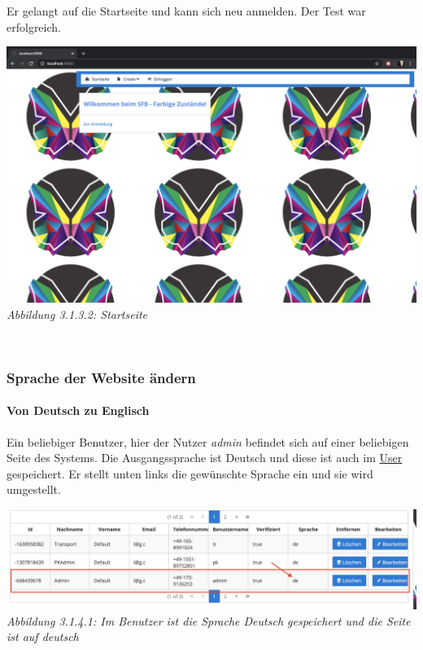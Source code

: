 \documentclass[enabledeprecatedfontcommands,fontsize=12pt,paper=a4,twoside]{scrartcl}
\begin{document}
Er gelangt auf die Startseite und kann sich neu anmelden. Der Test war erfolgreich. 

\hypertarget{sc3.1.3.2.1}{
\includegraphics[width=1\textwidth]{Screenshots/31132.png}
\textit{Abbildung 3.1.3.2: Startseite}
} \\


\subsubsection{Sprache der Website ändern}

\paragraph{Von Deutsch zu Englisch}

Ein beliebiger Benutzer, hier der Nutzer \textit{admin} befindet sich auf einer beliebigen Seite des Systems. Die Ausgangssprache ist Deutsch und diese ist auch im \hyperlink{sc3.1.4.1.1}{User} gespeichert.  Er stellt unten links die gewünschte Sprache ein und sie wird umgestellt. 

\hypertarget{sc3.1.4.1.1}{
\includegraphics[width=1\textwidth]{Screenshots/31141.png}
\textit{Abbildung 3.1.4.1: Im Benutzer ist die Sprache Deutsch gespeichert und die Seite ist auf deutsch}
} \\
\end{document}
